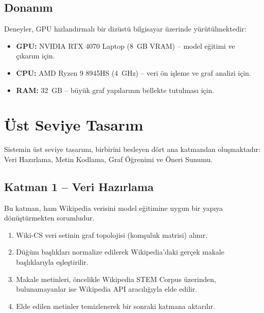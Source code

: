 \documentclass[12pt, a4paper]{article}
\begin{document}
\subsection{Donanım}

Deneyler, GPU hızlandırmalı bir dizüstü bilgisayar üzerinde yürütülmektedir:
\begin{itemize}
    \item \textbf{GPU:} NVIDIA RTX 4070 Laptop (8~GB VRAM) -- model eğitimi ve çıkarım için.
    \item \textbf{CPU:} AMD Ryzen 9 8945HS (4~GHz) -- veri ön işleme ve graf analizi için.
    \item \textbf{RAM:} 32~GB -- büyük graf yapılarının bellekte tutulması için.
\end{itemize}

\section{Üst Seviye Tasarım}

Sistemin üst seviye tasarımı, birbirini besleyen dört ana katmandan oluşmaktadır: Veri Hazırlama, Metin Kodlama, Graf Öğrenimi ve Öneri Sunumu.


\subsection{Katman 1 -- Veri Hazırlama}

Bu katman, ham Wikipedia verisini model eğitimine uygun bir yapıya dönüştürmekten sorumludur.

\begin{enumerate}
    \item Wiki-CS veri setinin graf topolojisi (komşuluk matrisi) alınır.
    \item Düğüm başlıkları normalize edilerek Wikipedia'daki gerçek makale başlıklarıyla eşleştirilir.
    \item Makale metinleri, öncelikle Wikipedia STEM Corpus üzerinden, bulunamayanlar ise Wikipedia API aracılığıyla elde edilir.
    \item Elde edilen metinler temizlenerek bir sonraki katmana aktarılır.
\end{enumerate}
\end{document}
